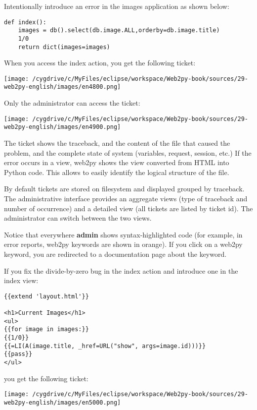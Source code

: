 \documentclass[justified,sixbynine,notoc]{tufte-book}
\begin{document}
\begin{fullwidth}
Intentionally introduce an error in the images application as shown below:
\begin{lstlisting}
def index():
    images = db().select(db.image.ALL,orderby=db.image.title)
    1/0
    return dict(images=images)
\end{lstlisting}

When you access the index action, you get the following ticket:


\goodbreak\begin{center}\texttt{[image: /cygdrive/c/MyFiles/eclipse/workspace/Web2py-book/sources/29-web2py-english/images/en4800.png]}\end{center}


Only the administrator can access the ticket:


\goodbreak\begin{center}\texttt{[image: /cygdrive/c/MyFiles/eclipse/workspace/Web2py-book/sources/29-web2py-english/images/en4900.png]}\end{center}


The ticket shows the traceback, and the content of the file that caused the problem, and the complete state of system (variables, request, session, etc.) If the error occurs in a view, web2py shows the view converted from HTML into Python code. This allows to easily identify the logical structure of the file.

By default tickets are stored on filesystem and displayed grouped by traceback. The administrative interface provides an aggregate views (type of traceback and number of occurrence) and a detailed view (all tickets are listed by ticket id). The administrator can switch between the two views.

Notice that everywhere {\bf admin} shows syntax-highlighted code (for example, in error reports, web2py keywords are shown in orange). If you click on a web2py keyword, you are redirected to a documentation page about the keyword.

If you fix the divide-by-zero bug in the index action and introduce one in the index view:
\begin{lstlisting}[keywords={}]
{{extend 'layout.html'}}

<h1>Current Images</h1>
<ul>
{{for image in images:}}
{{1/0}}
{{=LI(A(image.title, _href=URL("show", args=image.id)))}}
{{pass}}
</ul>
\end{lstlisting}
\noindent you get the following ticket:


\goodbreak\begin{center}\texttt{[image: /cygdrive/c/MyFiles/eclipse/workspace/Web2py-book/sources/29-web2py-english/images/en5000.png]}\end{center}



\end{fullwidth}
\end{document}

